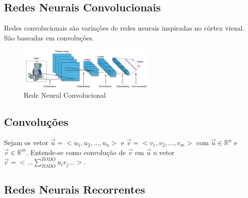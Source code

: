 \subsection{Redes Neurais Convolucionais}
Redes convolucionais são variações de redes neurais inspiradas no córtex visual. São baseadas em convoluções.

\begin{figure}[!ht]
	\centering
	\includegraphics[width=0.6\textwidth]{figures/cnn.png}   
	\caption{Rede Neural Convolucional}
	\label{fig:cnn}
\end{figure}

\subsection{Convoluções}
Sejam os vetor $\vec u = <u_1,u_2,\dots, u_n >$ e $\vec v = <v_1,v_2,\dots, v_m>$ com $\vec u \in \mathbb R^n$ e $\vec v \in \mathbb R^m$. Entende-se como convolução de $\vec v$ em $\vec u$ o vetor $\vec c = <\dots \sum\limits_{TODO}^{TODO} u_iv_j \dots>$.



\subsection{Redes Neurais Recorrentes}
